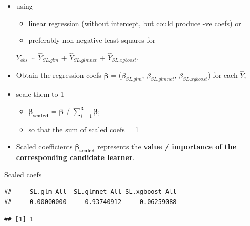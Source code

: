 \documentclass[
]{book}
\newenvironment{Shaded}{\begin{snugshade}}{\end{snugshade}}
\newcommand{\FunctionTok}[1]{\textcolor[rgb]{0.00,0.00,0.00}{#1}}
\newcommand{\NormalTok}[1]{#1}
\newcommand{\SpecialCharTok}[1]{\textcolor[rgb]{0.00,0.00,0.00}{#1}}
\providecommand{\tightlist}{%
  \setlength{\itemsep}{0pt}\setlength{\parskip}{0pt}}
\begin{document}
\begin{itemize}
\item
  using

  \begin{itemize}
  \tightlist
  \item
    linear regression (without intercept, but could produce -ve coefs) or
  \item
    preferably non-negative least squares for
  \end{itemize}

  \(Y_{obs}\) \(\sim\) \(\hat{Y}_{SL.glm}\) + \(\hat{Y}_{SL.glmnet}\) + \(\hat{Y}_{SL.xgboost}\).
\item
  Obtain the regression coefs \(\mathbf{\beta}\) = (\(\beta_{SL.glm}\), \(\beta_{SL.glmnet}\), \(\beta_{SL.xgboost}\)) for each \(\hat{Y}\),
\item
  scale them to 1

  \begin{itemize}
  \tightlist
  \item
    \(\mathbf{\beta_{scaled}}\) = \(\mathbf{\beta}\) / \(\sum_{i=1}^3{\mathbf{\beta}}\);
  \item
    so that the sum of scaled coefs = 1
  \end{itemize}
\item
  Scaled coefficients \(\mathbf{\beta_{scaled}}\) represents the \textbf{value / importance of the corresponding candidate learner}.
\end{itemize}

Scaled coefs

\begin{Shaded}
\end{Shaded}

\begin{verbatim}
##     SL.glm_All  SL.glmnet_All SL.xgboost_All 
##     0.00000000     0.93740912     0.06259088
\end{verbatim}

\begin{Shaded}
\end{Shaded}

\begin{verbatim}
## [1] 1
\end{verbatim}
\end{document}

